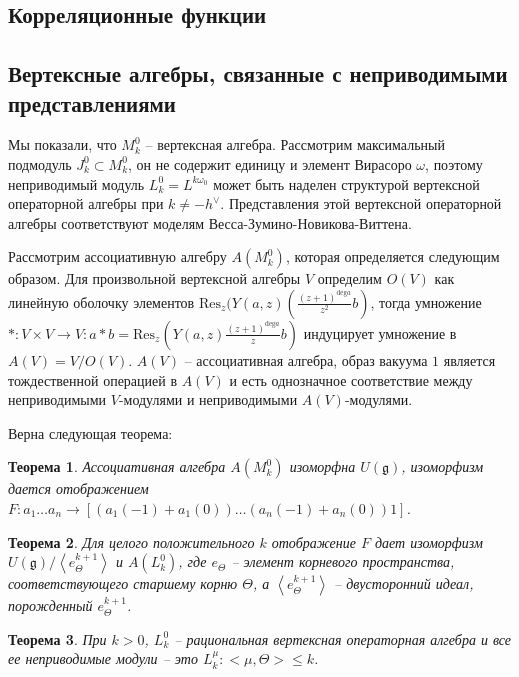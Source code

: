 \documentclass[12pt]{article}
\newtheorem{theorem}{Теорема}
\newcommand{\gf}{\mathfrak{g}}
\begin{document}
\subsection{Корреляционные функции}
\label{sec:correlation-functions}

\subsection{Вертексные алгебры, связанные с неприводимыми представлениями}
\label{sec:voa-irreps}

Мы показали, что $M^0_k$ -- вертексная алгебра. Рассмотрим максимальный подмодуль
$J^0_k\subset M^0_k$, он не содержит единицу и элемент Вирасоро $\omega$,
поэтому неприводимый модуль $L^0_k=L^{k\omega_0}$ может быть наделен структурой
вертексной операторной алгебры при $k\neq -h^{\vee}$. Представления этой
вертексной операторной алгебры соответствуют моделям
Весса-Зумино-Новикова-Виттена. 

Рассмотрим ассоциативную алгебру $A(M^0_k)$, которая определяется следующим
образом. Для произвольной вертексной алгебры $V$ определим $O(V)$ как линейную
оболочку элементов $\mathrm{Res}_z (Y(a,z)\left(\frac{(z+1)^{\mathrm{deg}
      a}}{z^2}b\right)$, тогда умножение $*:V\times V\to V:
a*b=\mathrm{Res}_z\left( Y(a,z)\frac{(z+1)^{\mathrm{deg} a}}{z} b\right)$
индуцирует умножение в $A(V)=V/O(V)$. $A(V)$ -- ассоциативная алгебра, образ
вакуума $1$ является тождественной операцией в $A(V)$ и есть однозначное
соответствие между неприводимыми $V$-модулями и неприводимыми $A(V)$-модулями.

Верна следующая теорема:
\begin{theorem}
  Ассоциативная алгебра $A(M^0_k)$ изоморфна $U(\gf)$, изоморфизм дается
  отображением $F:a_1\dots a_n \to [(a_1(-1)+a_1(0))\dots (a_n(-1)+a_n(0))1]$.
\end{theorem}

\begin{theorem}
  Для целого положительного $k$ отображение $F$ дает изоморфизм
  $U(\gf)/\left<e^{k+1}_{\Theta} \right>$ и $A(L^0_k)$, где $e_{\Theta}$ --
  элемент корневого пространства, соответствующего  старшему корню $\Theta$, а
  $\left<e_{\Theta}^{k+1}\right>$ -- двусторонний идеал, порожденный $e_{\Theta}^{k+1}$.
\end{theorem}

\begin{theorem}
  При $k>0$, $L^0_k$ -- рациональная вертексная операторная алгебра и все ее
  неприводимые модули -- это $L^{\mu}_k: <\mu,\Theta> \leq k$.
\end{theorem}
\end{document}
